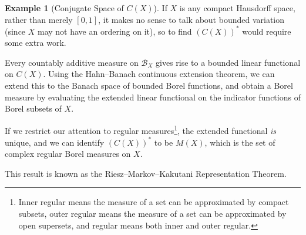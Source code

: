 \documentclass[10pt]{extarticle}
\theoremstyle{plain}
\theoremstyle{definition}
\newtheorem*{example}{Example}
\theoremstyle{note}
\renewcommand{\newline}{\hfill\break}
\begin{document}
\begin{example}[Conjugate Space of $C(X)$]
  If $X$ is any compact Hausdorff space, rather than merely $[0,1]$, it makes no sense to talk about bounded variation (since $X$ may not have an ordering on it), so to find $\left(C(X)\right)^{\ast}$ would require some extra work.\newline

  Every countably additive measure on $\mathcal{B}_{X}$ gives rise to a bounded linear functional on $C(X)$. Using the Hahn--Banach continuous extension theorem, we can extend this to the Banach space of bounded Borel functions, and obtain a Borel measure by evaluating the extended linear functional on the indicator functions of Borel subsets of $X$.\newline

  If we restrict our attention to regular measures\footnote{Inner regular means the measure of a set can be approximated by compact subsets, outer regular means the measure of a set can be approximated by open supersets, and regular means both inner and outer regular.}, the extended functional \textit{is} unique, and we can identify $\left(C(X)\right)^{\ast}$ to be $M(X)$, which is the set of complex regular Borel measures on $X$.\newline

  This result is known as the Riesz--Markov--Kakutani Representation Theorem.
\end{example}
\end{document}
